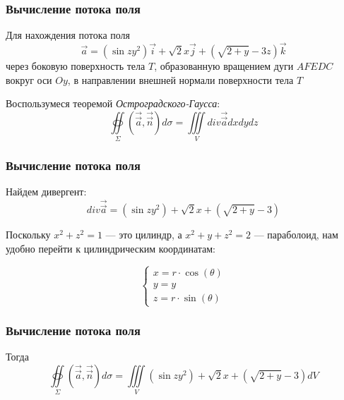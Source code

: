 \begin{frame}\frametitle{Вычисление потока поля}
  Для нахождения потока поля
  \begin{equation*}
		\vec a = (\sin zy^2) \vec i + \sqrt{2} x \vec j + (\sqrt{2+y} -3z) \vec k
	\end{equation*}
		      через боковую поверхность тела \(T\), образованную вращением дуги \(AFEDC\)
		      вокруг оси \(Oy\), в направлении внешней нормали поверхности тела \(T\)
 

  Воспользумеся теоремой \textit{Остроградского-Гаусса}:
  \begin{equation*}
    \oiint\limits_{\Sigma}\left( \overrightarrow{\vec {a}}, \overrightarrow{\vec {n}} \right) d\sigma = \iiint\limits_V div \overrightarrow{\vec {a}} dxdydz 
  \end{equation*}
\end{frame}


\begin{frame}\frametitle{Вычисление потока поля}
  Найдем дивергент:
  \begin{equation*}
    div \overrightarrow{\vec a} = (\sin zy^2) + \sqrt{2} x + (\sqrt{2+y} - 3)
	\end{equation*}
	
  Поскольку $x^2 + z^2 = 1$ — это цилиндр, а $x^2 + y + z^2 = 2$ — параболоид, нам удобно перейти к цилиндрическим координатам:

  \begin{equation*}
    \begin{cases}
      x = r \cdot \cos(\theta) \\
      y = y \\
      z = r \cdot \sin(\theta)
    \end{cases}
  \end{equation*}
  
\end{frame}

\begin{frame}\frametitle{Вычисление потока поля} 

Тогда
  \begin{equation*}
    \oiint\limits_{\Sigma}\left( \overrightarrow{\vec {a}}, \overrightarrow{\vec {n}} \right) d\sigma = \iiint\limits_V (\sin zy^2) + \sqrt{2} x + (\sqrt{2+y} - 3) dV
  \end{equation*}

\end{frame}
